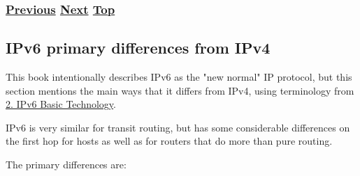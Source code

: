 \documentclass[
]{article}
\begin{document}
\subsubsection{\texorpdfstring{\hyperref[translation-and-ipv4-as-a-service]{Previous}
\hyperref[ipv6-primary-differences-from-ipv4]{Next}
\hyperref[coexistence-with-legacy-ipv4]{Top}}{Previous Next Top}}\label{previous-next-top-22}

\pagebreak

\subsection{IPv6 primary differences from
IPv4}\label{ipv6-primary-differences-from-ipv4}

This book intentionally describes IPv6 as the "new normal" IP protocol,
but this section mentions the main ways that it differs from IPv4, using
terminology from \hyperref[ipv6-basic-technology]{2. IPv6 Basic
Technology}.

IPv6 is very similar for transit routing, but has some considerable
differences on the first hop for hosts as well as for routers that do
more than pure routing.

The primary differences are:
\end{document}
